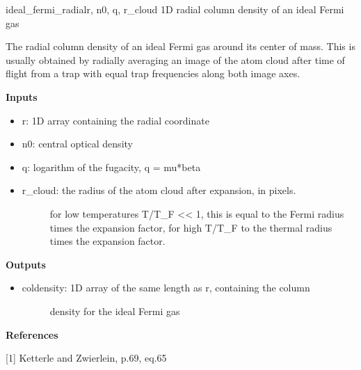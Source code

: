 \documentclass[letterpaper,10pt,english]{manual}
\begin{document}
\hypertarget{fitfuncs.ideal_fermi_radial}{}\begin{funcdesc}{ideal\_fermi\_radial}{r, n0, q, r\_cloud}
1D radial column density of an ideal Fermi gas

The radial column density of an ideal Fermi gas around its center of mass.
This is usually obtained by radially averaging an image of the atom cloud
after time of flight from a trap with equal trap frequencies along both
image axes.

\textbf{Inputs}
\begin{itemize}
\item {} 
r: 1D array containing the radial coordinate

\item {} 
n0: central optical density

\item {} 
q: logarithm of the fugacity, q = mu*beta

\item {} \begin{description}
\item[r\_cloud: the radius of the atom cloud after expansion, in pixels.]
for low temperatures T/T\_F \textless{}\textless{} 1, this is equal to the
Fermi radius times the expansion factor, for high T/T\_F
to the thermal radius times the expansion factor.

\end{description}

\end{itemize}

\textbf{Outputs}
\begin{itemize}
\item {} \begin{description}
\item[coldensity: 1D array of the same length as r, containing the column]
density for the ideal Fermi gas

\end{description}

\end{itemize}

\textbf{References}

{[}1{]} Ketterle and Zwierlein, p.69, eq.65
\end{funcdesc}
\end{document}
